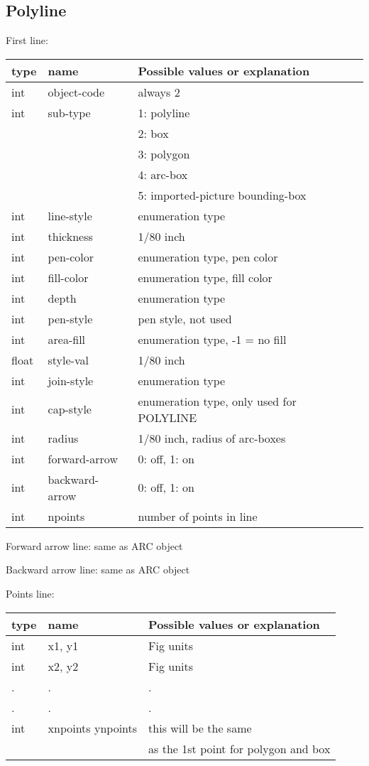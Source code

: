 \documentclass[10pt, a4paper]{article}
\begin{document}
\subsection{Polyline}\label{subsec:polyline}

    First line:

\begin{tabular}{|lll|}
\hline
type & name & Possible values or explanation \\
\hline
\hline
int    & object-code    & always 2 \\
int    & sub-type       & 1: polyline \\
&&                       2: box \\
&&                       3: polygon \\
&&                       4: arc-box \\
&&                       5: imported-picture bounding-box \\
int    & line-style     & enumeration type \\
int    & thickness      & 1/80 inch \\
int    & pen-color      & enumeration type, pen color \\
int    & fill-color     & enumeration type, fill color \\
int    & depth          & enumeration type \\
int    & pen-style      & pen style, not used \\
int    & area-fill      & enumeration type, -1 = no fill \\
float  & style-val      & 1/80 inch \\
int    & join-style     & enumeration type \\
int    & cap-style      & enumeration type, only used for POLYLINE \\
int    & radius         & 1/80 inch, radius of arc-boxes \\
int    & forward-arrow  & 0: off, 1: on \\
int    & backward-arrow & 0: off, 1: on \\
int    & npoints        & number of points in line \\
\hline
\end{tabular}

    Forward arrow line: same as ARC object

    Backward arrow line: same as ARC object

    Points line:

\begin{tabular}{|lll|}
\hline
type & name & Possible values or explanation \\
\hline
\hline
int & x1, y1            & Fig units \\
int & x2, y2            & Fig units \\
  . &  .    &  .    \\
  . &  .    &  .    \\
int & xnpoints ynpoints & this will be the same \\
    &                   & as the 1st point for polygon and box \\
\hline
\end{tabular}
\end{document}
